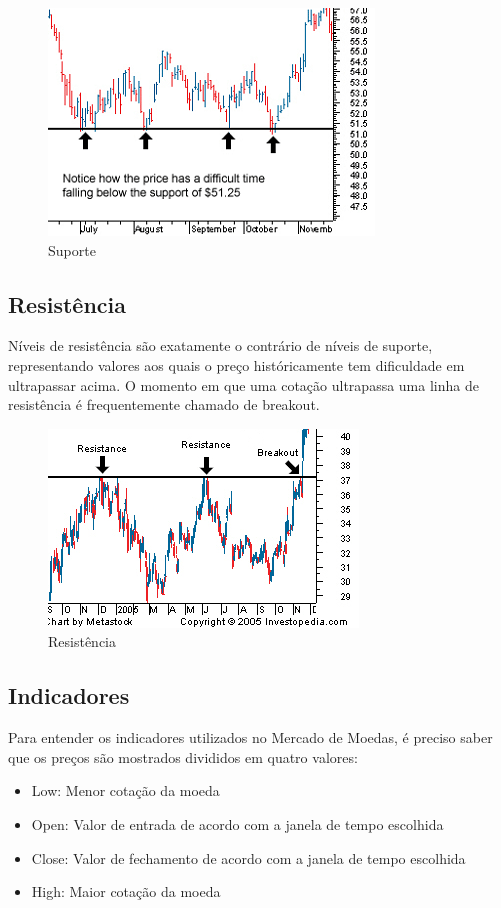 \begin{figure}[h]
	\centering
	\includegraphics[keepaspectratio=true,scale=1]{figuras/sup.png}
	\caption{Suporte \cite{investopedia}}
	\label{fig03}
\end{figure}

\subsection{Resistência}

Níveis de resistência são exatamente o contrário de níveis de suporte, representando valores aos quais o preço históricamente tem dificuldade
em ultrapassar acima. O momento em que uma cotação ultrapassa uma linha de resistência é frequentemente chamado de breakout. \cite{allen}

\begin{figure}[h]
	\centering
	\includegraphics[keepaspectratio=true,scale=1]{figuras/resist.png}
	\caption{Resistência \cite{investopedia}}
	\label{fig04}
\end{figure}

\subsection{Indicadores}

Para entender os indicadores utilizados no Mercado de Moedas, é preciso saber que os preços são mostrados divididos em quatro valores:
\begin{itemize}
  \item Low: Menor cotação da moeda
  \item Open: Valor de entrada de acordo com a janela de tempo escolhida
  \item Close: Valor de fechamento de acordo com a janela de tempo escolhida
  \item High: Maior cotação da moeda
\end{itemize}

